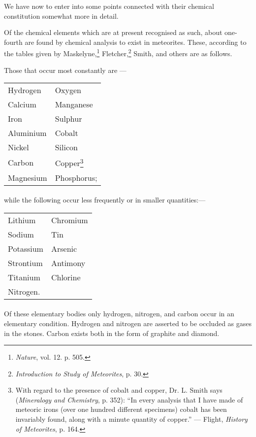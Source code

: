 \documentclass[a4paper, 12pt, oneside, polutonikogreek, english]{article}
\begin{document}
We have now to enter into some points connected with their chemical constitution somewhat more in detail.

Of the chemical elements which are at present recognised as such, about one-fourth are found by chemical analysis to exist in meteorites. These, according to the tables given by Maskelyne,\footnote{\emph{Nature}, vol. 12. p. 505.} Fletcher,\footnote{\emph{Introduction to Study of Meteorites}, p. 30.} Smith, and others are as follows.

Those that occur most constantly are ---
\begin{table}[H]
    \centering
    \begin{tabular}{l l}
        Hydrogen  & Oxygen  \\ 
        Calcium  & Manganese  \\ 
        Iron  & Sulphur  \\ 
        Aluminium  & Cobalt  \\ 
        Nickel  & Silicon  \\ 
        Carbon  & Copper\footnote{With regard to the presence of cobalt and copper, Dr. L. Smith says (\emph{Mineralogy and Chemistry}, p. 352): ``In every analysis that I have made of meteoric irons (over one hundred different specimens) cobalt has been invariably found, along with a minute quantity of copper.'' --- Flight, \emph{History of Meteorites}, p. 164.}  \\ 
        Magnesium  & Phosphorus; \\ 
    \end{tabular}
\end{table}
\paragraph{}
while the following occur less frequently or in smaller quantities:---
\begin{table}[H]
    \centering
    \begin{tabular}{l l}
        Lithium & Chromium \\ 
        Sodium & Tin \\ 
        Potassium & Arsenic \\ 
        Strontium & Antimony \\ 
        Titanium & Chlorine \\ 
        Nitrogen. & ~ \\ 
    \end{tabular}
\end{table}
\paragraph{}
Of these elementary bodies only hydrogen, nitrogen, and carbon occur in an elementary condition. Hydrogen and nitrogen are asserted to be occluded as gases in the stones. Carbon exists both in the form of graphite and diamond.
\end{document}
